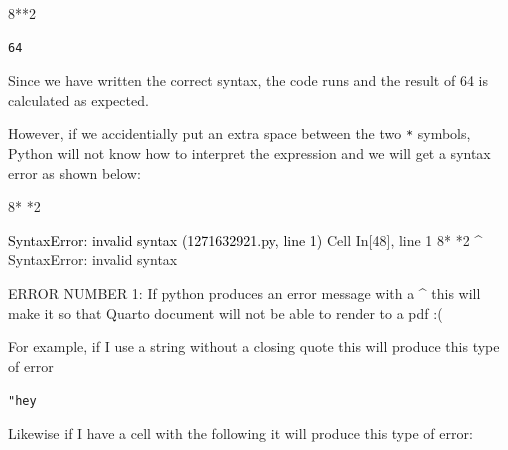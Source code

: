 \documentclass[
  letterpaper,
  DIV=11,
  numbers=noendperiod]{scrreprt}
\newenvironment{Shaded}{\begin{snugshade}}{\end{snugshade}}
\newcommand{\DecValTok}[1]{\textcolor[rgb]{0.68,0.00,0.00}{#1}}
\newcommand{\OperatorTok}[1]{\textcolor[rgb]{0.37,0.37,0.37}{#1}}
\begin{document}
\begin{Shaded}
\begin{Highlighting}[]
\DecValTok{8}\OperatorTok{**}\DecValTok{2}
\end{Highlighting}
\end{Shaded}

\begin{verbatim}
64
\end{verbatim}

Since we have written the correct syntax, the code runs and the result
of 64 is calculated as expected.

However, if we accidentially put an extra space between the two
\texttt{*} symbols, Python will not know how to interpret the expression
and we will get a syntax error as shown below:

\begin{Shaded}
\begin{Highlighting}[]
\DecValTok{8}\OperatorTok{*} \OperatorTok{*}\DecValTok{2}
\end{Highlighting}
\end{Shaded}

\begin{Highlighting}
\textcolor{black}{SyntaxError: invalid syntax (1271632921.py, line 1)}
\textcolor{black}{  }\textcolor{QuartoInternalColor1}{Cell}\textcolor{QuartoInternalColor2}{}\textcolor{QuartoInternalColor1}{ }\textcolor{QuartoInternalColor2}{}\textcolor{QuartoInternalColor3}{In[48]}\textcolor{QuartoInternalColor2}{}\textcolor{QuartoInternalColor3}{, line 1}\textcolor{QuartoInternalColor2}{}
\textcolor{QuartoInternalColor2}{}\textcolor{QuartoInternalColor4}{    }\textcolor{QuartoInternalColor2}{}\textcolor{QuartoInternalColor4}{8* *2}\textcolor{QuartoInternalColor2}{}
\textcolor{QuartoInternalColor2}{       ^}
\textcolor{QuartoInternalColor2}{}\textcolor{QuartoInternalColor4}{SyntaxError}\textcolor{QuartoInternalColor2}{}\textcolor{QuartoInternalColor4}{:}\textcolor{QuartoInternalColor2}{ invalid syntax}
\end{Highlighting}

ERROR NUMBER 1: If python produces an error message with a \^{} this
will make it so that Quarto document will not be able to render to a pdf
:(

For example, if I use a string without a closing quote this will produce
this type of error

\texttt{"hey}

Likewise if I have a cell with the following it will produce this type
of error:
\end{document}
